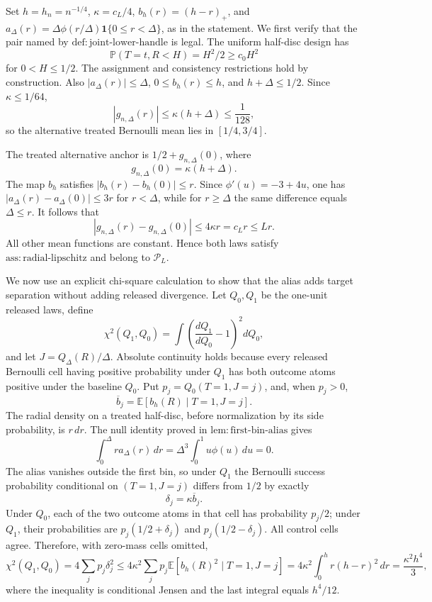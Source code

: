 Set \(h=h_n=n^{-1/4}\), \(\kappa=c_L/4\), \(b_h(r)=(h-r)_+\), and \(a_\Delta(r)=\Delta\phi(r/\Delta)\mathbf1\{0\le r<\Delta\}\), as in the statement.  We first verify that the pair named by \(\mathrm{def:joint\text{-}lower\text{-}handle}\) is legal.  The uniform half-disc design has
\[
 \mathbb P(T=t,R<H)=H^2/2\ge c_0H^2
\]
for \(0<H\le1/2\).  The assignment and consistency restrictions hold by construction.  Also \(|a_\Delta(r)|\le\Delta\), \(0\le b_h(r)\le h\), and \(h+\Delta\le1/2\).  Since \(\kappa\le1/64\),
\[
 |g_{n,\Delta}(r)|\le\kappa(h+\Delta)\le\frac1{128},
\]
so the alternative treated Bernoulli mean lies in \([1/4,3/4]\).

The treated alternative anchor is \(1/2+g_{n,\Delta}(0)\), where
\[
 g_{n,\Delta}(0)=\kappa(h+\Delta).
\]
The map \(b_h\) satisfies \(|b_h(r)-b_h(0)|\le r\).  Since \(\phi'(u)=-3+4u\), one has \(|a_\Delta(r)-a_\Delta(0)|\le3r\) for \(r<\Delta\), while for \(r\ge\Delta\) the same difference equals \(\Delta\le r\).  It follows that
\[
 |g_{n,\Delta}(r)-g_{n,\Delta}(0)|
 \le4\kappa r=c_Lr\le Lr.
\]
All other mean functions are constant.  Hence both laws satisfy \(\mathrm{ass:radial\text{-}lipschitz}\) and belong to \(\mathcal P_L\).

We now use an explicit chi-square calculation to show that the alias adds target separation without adding released divergence.  Let \(Q_0,Q_1\) be the one-unit released laws, define
\[
 \chi^2(Q_1,Q_0)=\int\left(\frac{dQ_1}{dQ_0}-1\right)^2dQ_0,
\]
and let \(J=Q_\Delta(R)/\Delta\).  Absolute continuity holds because every released Bernoulli cell having positive probability under \(Q_1\) has both outcome atoms positive under the baseline \(Q_0\).  Put \(p_j=Q_0(T=1,J=j)\), and, when \(p_j>0\),
\[
 \overline b_j=\mathbb E[b_h(R)\mid T=1,J=j].
\]
The radial density on a treated half-disc, before normalization by its side probability, is \(r\,dr\).  The null identity proved in \(\mathrm{lem:first\text{-}bin\text{-}alias}\) gives
\[
 \int_0^\Delta r a_\Delta(r)\,dr
 =\Delta^3\int_0^1u\phi(u)\,du=0.
\]
The alias vanishes outside the first bin, so under \(Q_1\) the Bernoulli success probability conditional on \((T=1,J=j)\) differs from \(1/2\) by exactly
\[
 \delta_j=\kappa\overline b_j.
\]
Under \(Q_0\), each of the two outcome atoms in that cell has probability \(p_j/2\); under \(Q_1\), their probabilities are \(p_j(1/2+\delta_j)\) and \(p_j(1/2-\delta_j)\).  All control cells agree.  Therefore, with zero-mass cells omitted,
\[
 \chi^2(Q_1,Q_0)
 =4\sum_jp_j\delta_j^2
 \le4\kappa^2\sum_jp_j\mathbb E[b_h(R)^2\mid T=1,J=j]
 =4\kappa^2\int_0^h r(h-r)^2\,dr
 =\frac{\kappa^2h^4}{3},
\]
where the inequality is conditional Jensen and the last integral equals \(h^4/12\).

